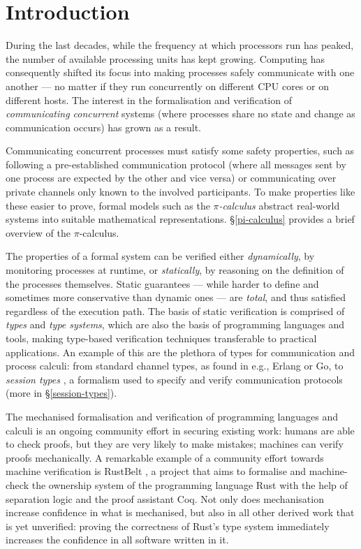 \documentclass{mproj}
\newcommand{\picalc}{$\pi$-calculus}
\begin{document}
\chapter{Introduction}\label{intro}

During the last decades, while the frequency at which processors run has peaked, the number of available processing units has kept growing. Computing has consequently shifted its focus into making processes safely communicate with one another --- no matter if they run concurrently on different CPU cores or on different hosts. The interest in the formalisation and verification of \emph{communicating concurrent} systems (where processes share no state and change as communication occurs) has grown as a result.

Communicating concurrent processes must satisfy some safety properties, such as following a pre-established communication protocol (where all messages sent by one process are expected by the other and vice versa) or communicating over private channels only known to the involved participants. To make properties like these easier to prove, formal models such as the \emph{\picalc{}} \cite{Walker1989,Milner1989,Milner1991,Sangiorgi2001} abstract real-world systems into suitable mathematical representations. \S \ref{pi-calculus} provides a brief overview of the \picalc.

The properties of a formal system can be verified either \emph{dynamically}, by monitoring processes at runtime, or \emph{statically}, by reasoning on the definition of the processes themselves.  Static guarantees --- while harder to define and sometimes more conservative than dynamic ones --- are \emph{total}, and thus satisfied regardless of the execution path. The basis of static verification is comprised of \emph{types} and \emph{type systems}, which are also the basis of programming languages and tools, making type-based verification techniques transferable to practical applications. An example of this are the plethora of types for communication and process calculi: from standard channel types, as found in e.g., Erlang or Go, to \emph{session types} \cite{Honda1993, Takeuchi1994, Honda1998}, a formalism used to specify and verify communication protocols (more in \S \ref{session-types}).

The mechanised formalisation and verification of programming languages and calculi is an ongoing community effort in securing existing work: humans are able to check proofs, but they are very likely to make mistakes; machines can verify proofs mechanically. A remarkable example of a community effort towards machine verification is RustBelt \cite{Dreyer2018}, a project that aims to formalise and machine-check the ownership system of the programming language Rust with the help of separation logic \cite{} and the proof assistant Coq. Not only does mechanisation increase confidence in what is mechanised, but also in all other derived work that is yet unverified: proving the correctness of Rust's type system immediately increases the confidence in all software written in it.
\end{document}
